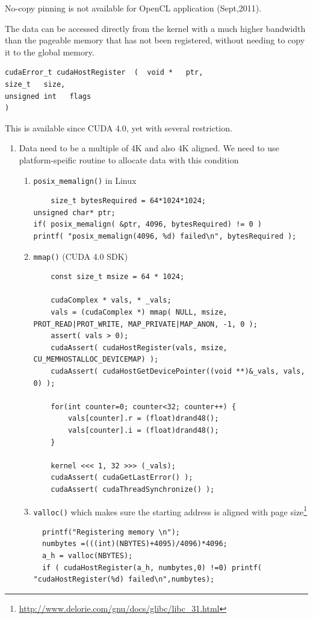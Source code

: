 \begin{framed}
No-copy pinning is not available for OpenCL application (Sept,2011).
\end{framed}

The data can be accessed directly from the kernel with a much higher bandwidth
than the pageable memory that has not been registered, without needing to copy
it to the global memory. 
\begin{lstlisting}
cudaError_t cudaHostRegister  (  void *   ptr,
size_t   size,
unsigned int   flags   
)  
\end{lstlisting}

This is available since CUDA 4.0, yet with
several restriction.
\begin{enumerate}
  \item Data need to be a multiple of 4K and also 4K aligned. We need to use
  platform-speific routine to allocate data with this condition
  \begin{enumerate}
    \item   \verb!posix_memalign()! in Linux
    \begin{lstlisting}
    size_t bytesRequired = 64*1024*1024;
unsigned char* ptr;
if( posix_memalign( &ptr, 4096, bytesRequired) != 0 )
printf( "posix_memalign(4096, %d) failed\n", bytesRequired ); 
    \end{lstlisting}
    \item \verb!mmap()! (CUDA 4.0 SDK)
    \begin{lstlisting}
    const size_t msize = 64 * 1024;
    
    cudaComplex * vals, * _vals;
    vals = (cudaComplex *) mmap( NULL, msize, PROT_READ|PROT_WRITE, MAP_PRIVATE|MAP_ANON, -1, 0 );
    assert( vals > 0);
    cudaAssert( cudaHostRegister(vals, msize, CU_MEMHOSTALLOC_DEVICEMAP) );
    cudaAssert( cudaHostGetDevicePointer((void **)&_vals, vals, 0) );
    
    for(int counter=0; counter<32; counter++) {
        vals[counter].r = (float)drand48();
        vals[counter].i = (float)drand48();
    }

    kernel <<< 1, 32 >>> (_vals);
    cudaAssert( cudaGetLastError() );
    cudaAssert( cudaThreadSynchronize() );
    \end{lstlisting}
    
    \item \verb!valloc()! which makes sure the starting address is aligned with   
    page
    size\footnote{\url{http://www.delorie.com/gnu/docs/glibc/libc_31.html}}
  \begin{lstlisting}
  printf("Registering memory \n");
  numbytes =(((int)(NBYTES)+4095)/4096)*4096;
  a_h = valloc(NBYTES);
  if ( cudaHostRegister(a_h, numbytes,0) !=0) printf( "cudaHostRegister(%d) failed\n",numbytes);
  \end{lstlisting}
  

\end{enumerate}
\end{enumerate}
